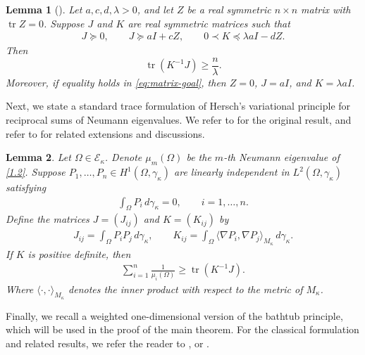 \documentclass[11pt,leqno]{amsart}
\newtheorem{lemma}{Lemma}[section]
\def\k{\kappa}
\def\k{\kappa}
\def\tr{\operatorname{tr}}
\def\tr{\operatorname{tr}}
\numberwithin{equation}{section}
\begin{document}
\begin{lemma}[\cite{HLT26}]\label{lm2.1}
Let $a,c,d,\lambda>0$, and let $Z$ be a real symmetric $n\times n$
matrix with $\operatorname{tr} Z=0$. Suppose  $J$ and $K$ are real symmetric
matrices such that
\begin{align*}
        J\succeq0,
        \qquad
        J\succeq aI+cZ,
        \qquad
        0\prec K\preceq \lambda aI-dZ.
\end{align*}
Then
\begin{equation}\label{eq:matrix-goal}
        \tr(K^{-1}J)\geq \frac{n}{\lambda}.
\end{equation}
Moreover, if equality holds in \eqref{eq:matrix-goal}, then $Z=0$,
$J=aI$, and $K=\lambda aI$. 
\end{lemma}

Next, we state a standard trace formulation of Hersch’s variational principle for reciprocal sums of Neumann eigenvalues. We refer to \cite{HerschCRAS} for the original result, and refer to \cite{Fr26, Hile&Xu}  for related extensions and discussions.

\begin{lemma}\label{lm2.2}
Let $\Omega\in \mathcal{E}_\k$. Denote $\mu_m(\Omega)$ be the $m$-th Neumann eigenvalue of \eqref{1.2}.
Suppose
$P_1, \ldots, P_n\in H^1(\Omega,\gamma_{\kappa})$ are linearly independent in
$L^2(\Omega,\gamma_{\k})$ satisfying
\begin{align*}
        \int_\Omega P_i\,d\gamma_{\kappa}=0,
        \qquad i=1,\ldots,n.
\end{align*}
Define the matrices $J=(J_{ij})$ and $K=(K_{ij})$ by
\begin{align*}
            J_{ij}=\int_\Omega P_iP_j\,d\gamma_{\kappa},
        \qquad
        K_{ij}=\int_\Omega \langle \nabla P_i, \nabla P_j\rangle_{M_\k}\,d\gamma_{\kappa}.
\end{align*}
If $K$ is positive definite, then
\begin{align*}
          \sum_{i=1}^n \frac1{\mu_i(\Omega)}\geq \tr(K^{-1}J).
\end{align*}
Where   $\langle \cdot, \cdot\rangle_{M_{\k}}$  denotes the inner product with respect to the metric of $M_\k$.
\end{lemma}

Finally, we recall a weighted one-dimensional version of the bathtub principle, which will be used in the proof of the main theorem. For the classical formulation and related results, we refer the reader to \cite[Theorem~1.14]{LiebLoss}, \cite[Lemma~3.2]{HLT26} or \cite[~Lemma 4.1]{Fr26}.
\end{document}
